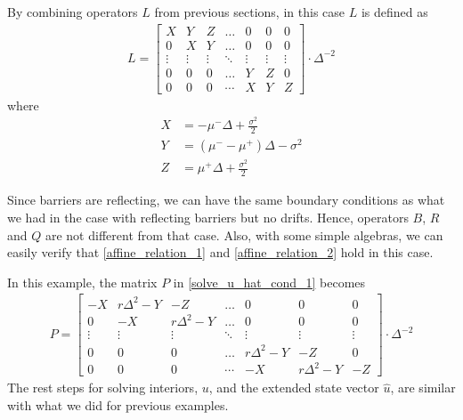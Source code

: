 \documentclass[11pt]{article}
\begin{document}
By combining operators $L$ from previous sections, in this case $L$ is defined as
\begin{align}
L = \begin{bmatrix}
X&Y&Z&\dots&0&0&0\\
0&X&Y&\dots&0&0&0\\
\vdots&\vdots&\vdots&\ddots&\vdots&\vdots&\vdots\\
0&0&0&\dots&Y&Z&0\\
0&0&0&\cdots&X&Y&Z
\end{bmatrix}\cdot \Delta^{-2}\nonumber
\end{align}
where
\begin{align*}
X &= -\mu^-\Delta+\frac{\sigma^2}{2}\\
Y &= (\mu^--\mu^+)\Delta-\sigma^2\\
Z &=\mu^+\Delta+\frac{\sigma^2}{2}
\end{align*}

Since barriers are reflecting, we can have the same boundary conditions as what we had in the case with reflecting barriers but no drifts. Hence, operators $B$, $R$ and $Q$ are not different from that case. Also, with some simple algebras, we can easily verify that \eqref{affine_relation_1} and \eqref{affine_relation_2} hold in this case.

In this example, the matrix $P$ in \eqref{solve_u_hat_cond_1} becomes
\begin{align}
P = \begin{bmatrix}
-X&r\Delta^2-Y&-Z&\dots&0&0&0\\
0&-X&r\Delta^2-Y&\dots&0&0&0\\
\vdots&\vdots&\vdots&\ddots&\vdots&\vdots&\vdots\\
0&0&0&\dots&r\Delta^2-Y&-Z&0\\
0&0&0&\cdots&-X&r\Delta^2-Y&-Z
\end{bmatrix}\cdot \Delta^{-2}
\end{align}
The rest steps for solving interiors, $u$, and the extended state vector $\hat{u}$, are similar with what we did for previous examples.
\end{document}
